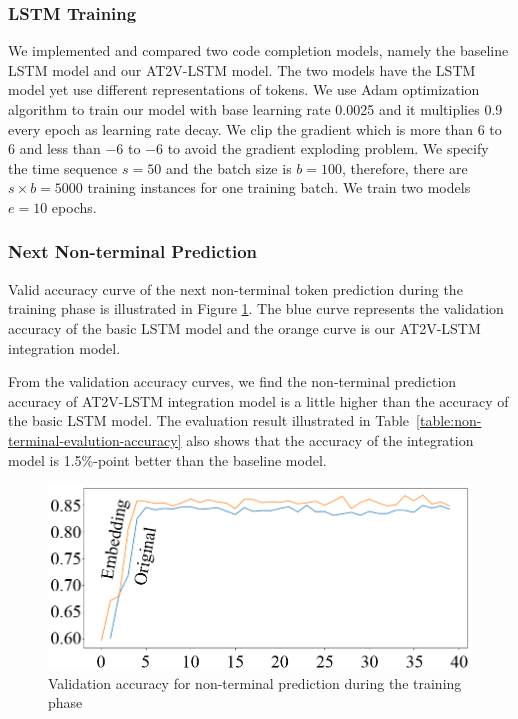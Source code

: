 \documentclass[E]{compsoft}
\begin{document}
\subsubsection{LSTM Training}
We implemented and compared two code completion models, namely the baseline LSTM model and our AT2V-LSTM model.  The two models have the LSTM model yet use different representations of tokens.
We use Adam optimization algorithm to train our model with base learning rate 0.0025 and it multiplies 0.9 every epoch as learning rate decay. 
We clip the gradient which is more than 6 to 6 and less than $-6$ to $-6$ to avoid the gradient exploding problem.
We specify the time sequence $s=50$ and the batch size is $b=100$, therefore, there are $s \times b = 5000$ training instances for one training batch. 
We train two models $e=10$ epochs.

\subsubsection{Next Non-terminal Prediction} 
Valid accuracy curve of the next non-terminal token prediction during the training phase is illustrated in Figure \ref{fig:valid_accuracy_for_non_terminal}. 
The blue curve represents the validation accuracy of the basic LSTM model and the orange curve is our AT2V-LSTM integration model. 

From the validation accuracy curves, we find the non-terminal prediction accuracy of AT2V-LSTM integration model is a little higher than the accuracy of the basic LSTM model. The evaluation result illustrated in Table~\ref{table:non-terminal-evalution-accuracy} also shows that the accuracy of the integration model is 1.5\%-point better than the baseline model. 

\begin{figure}[!ht]
\centering
\includegraphics[width=\columnwidth]{pictures/nt_valid_accuracy_v4.png}
\caption{Validation accuracy for non-terminal prediction during the training phase}
\label{fig:valid_accuracy_for_non_terminal}
\end{figure}
\end{document}

